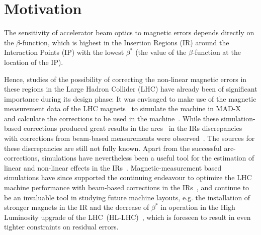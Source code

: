 \section{Motivation}


The sensitivity of accelerator beam optics to magnetic errors depends directly on the $\beta$-function, 
which is highest in the Insertion Regions (IR) around the Interaction Points (IP) 
with the lowest $\beta^*$ (the value of the $\beta$-function at the location of the IP).

Hence, studies of the possibility of correcting the non-linear magnetic errors in these regions in the Large Hadron Collider (LHC)
have already been of significant importance during its design phase:
It was envisaged to make use of the magnetic measurement data of the LHC 
magnets~\cite{SammutMathematicalFormulationPredict2006,SammutMathematicalFormulationPredict2007,SammutMathematicalFormulationPredict2009} to
simulate the machine in MAD-X~\cite{DeniauMADXUserGuide} and calculate the corrections to be used in the
machine~\cite{BruningFieldQualityIssues2004,BruningDynamicApertureStudies2004,TomasNonlinearCorrectionSchemes2009}.
While these simulation-based corrections produced great results in the arcs~\cite{PerssonChromaticCouplingCorrection2013}
in the IRs discrepancies with corrections from beam-based measurements
were observed~\cite{MacleanFirstMeasurementCorrection2015}.
The sources for these discrepancies are still not fully known.
Apart from the successful arc-corrections, 
simulations have nevertheless been a useful tool for the estimation of linear and non-linear 
effects in the IRs~\cite{MacleanNewApproachLHC2019,MacleanFirstMeasurementCorrection2015,
TomasCERNLargeHadron2010,DillyAmplitudeDetuningMisaligned2020}.
Magnetic-measurement based simulations have since supported 
the continuing endeavour to optimize the LHC machine performance
with beam-based corrections in the IRs~\cite{MacleanCommissioningNonlinearOptics2016,
MacleanNewMethodsMeasurement2017,MacleanNewLHCOptics2017,MacleanDetailedReviewLHC2019,
MacleanNewApproachLHC2019,MacleanProspectsBeambasedStudy2022},
and continue to be an invaluable tool in studying future machine layouts,
e.g. the installation of stronger magnets in the IR and the decrease of $\beta^*$ in operation in the High Luminosity upgrade of the 
LHC~(HL-LHC)~\cite{FartoukhHLLHCAcceleratorPhysics2015,AberleHighLuminosityLargeHadron2020},
which is foreseen to result in even tighter constraints on residual errors. 

